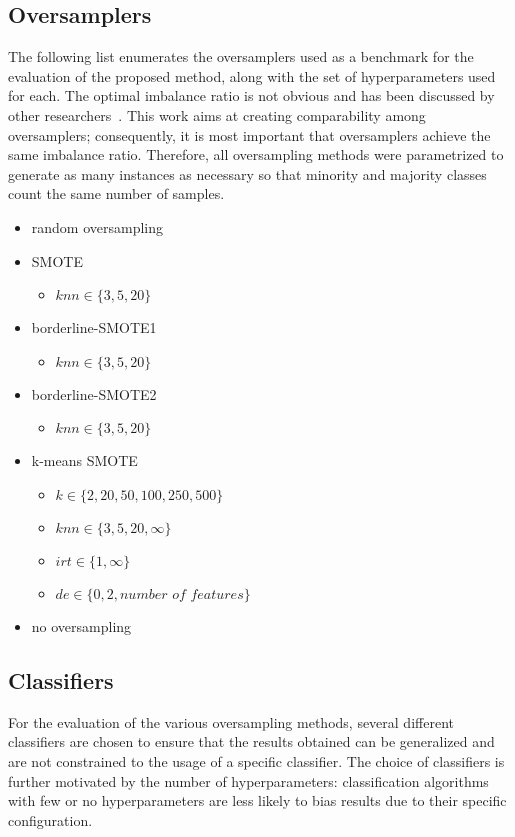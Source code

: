 \documentclass[sort&compress]{elsarticle}
\begin{document}
	\subsection{Oversamplers}
	The following list enumerates the oversamplers used as a benchmark for the evaluation of the proposed method, along with the set of hyperparameters used for each. The optimal imbalance ratio is not obvious and has been discussed by other researchers~\citep{Provost.2000,Estabrooks.2004,Chawla.2008}. This work aims at creating comparability among oversamplers; consequently, it is most important that oversamplers achieve the same imbalance ratio. Therefore, all oversampling methods were parametrized to generate as many instances as necessary so that minority and majority classes count the same number of samples.
	\begin{itemize}
		\item random oversampling
		\item SMOTE
		\begin{itemize}
			\item $knn \in \{3, 5, 20\}$
		\end{itemize}
		\item borderline-SMOTE1
		\begin{itemize}
			\item $knn \in \{3, 5, 20\}$
		\end{itemize}
		\item borderline-SMOTE2
		\begin{itemize}
			\item $knn \in \{3, 5, 20\}$
		\end{itemize}
		\item k-means SMOTE
		\begin{itemize}
			\item $k \in \{2, 20, 50, 100, 250, 500\}$
			\item $knn \in \{3, 5, 20, \infty\}$
			\item $irt \in \{1, \infty\}$
			\item $de \in \{0, 2, \textit{number of features}\}$
		\end{itemize}
		\item no oversampling
	\end{itemize}

	\subsection{Classifiers}
	For the evaluation of the various oversampling methods, several different classifiers are chosen to ensure that the results obtained can be generalized and are not constrained to the usage of a specific classifier. The choice of classifiers is further motivated by the number of hyperparameters: classification algorithms with few or no hyperparameters are less likely to bias results due to their specific configuration.
\end{document}
